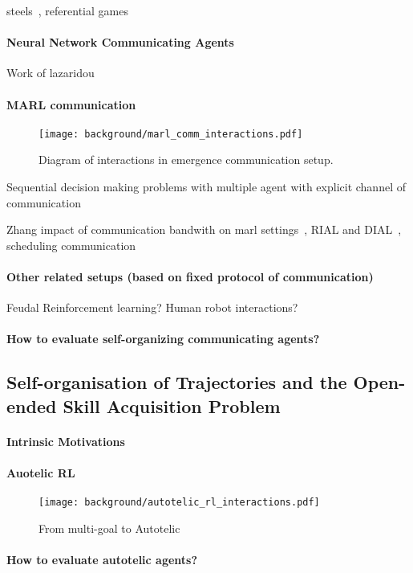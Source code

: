 steels~\citep{steels2001language}, referential games~\citep{Lewis1969}

\paragraph{Neural Network Communicating Agents}

Work of lazaridou~\citep{lazaridou2017multiagent}

\paragraph{MARL communication}

\begin{figure}[!h]
\centering
\texttt{[image: background/marl\_comm\_interactions.pdf]}	
\caption{Diagram of interactions in \marl emergence communication setup.}
\label{fig:marl_comm_interactions}
\end{figure}

Sequential decision making problems with multiple agent with explicit channel of communication

Zhang impact of communication bandwith on marl settings~\citep{zhang2013coordinating}, RIAL and DIAL~\citep{foerster2016learning}, scheduling communication~\citep{kim2021communication}

\paragraph{Other related setups (based on fixed protocol of communication)}

Feudal Reinforcement learning? Human robot interactions?

\paragraph{How to evaluate self-organizing communicating agents?}


\subsection{Self-organisation of Trajectories and the Open-ended Skill Acquisition Problem}
\label{sec:self-orga-traj}

\paragraph{Intrinsic Motivations}

\paragraph{Auotelic RL}

\begin{figure}[!h]
\centering
\texttt{[image: background/autotelic\_rl\_interactions.pdf]}	
\caption{From multi-goal \rl to Autotelic \rl}
\label{fig:autotelic_interactions}
\end{figure}


\paragraph{How to evaluate autotelic agents?}



